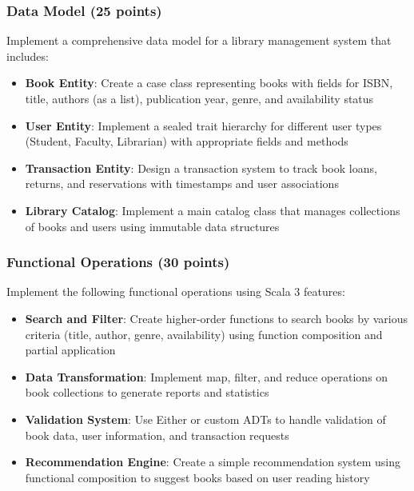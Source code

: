 \documentclass[11pt,a4paper]{article}
\begin{document}
\subsubsection{Data Model (25 points)}

Implement a comprehensive data model for a library management system that includes:

\begin{itemize}
    \item \textbf{Book Entity}: Create a case class representing books with fields for ISBN, title, authors (as a list), publication year, genre, and availability status
    \item \textbf{User Entity}: Implement a sealed trait hierarchy for different user types (Student, Faculty, Librarian) with appropriate fields and methods
    \item \textbf{Transaction Entity}: Design a transaction system to track book loans, returns, and reservations with timestamps and user associations
    \item \textbf{Library Catalog}: Implement a main catalog class that manages collections of books and users using immutable data structures
\end{itemize}

\subsubsection{Functional Operations (30 points)}

Implement the following functional operations using Scala 3 features:

\begin{itemize}
    \item \textbf{Search and Filter}: Create higher-order functions to search books by various criteria (title, author, genre, availability) using function composition and partial application
    \item \textbf{Data Transformation}: Implement map, filter, and reduce operations on book collections to generate reports and statistics
    \item \textbf{Validation System}: Use Either or custom ADTs to handle validation of book data, user information, and transaction requests
    \item \textbf{Recommendation Engine}: Create a simple recommendation system using functional composition to suggest books based on user reading history
\end{itemize}
\end{document}
